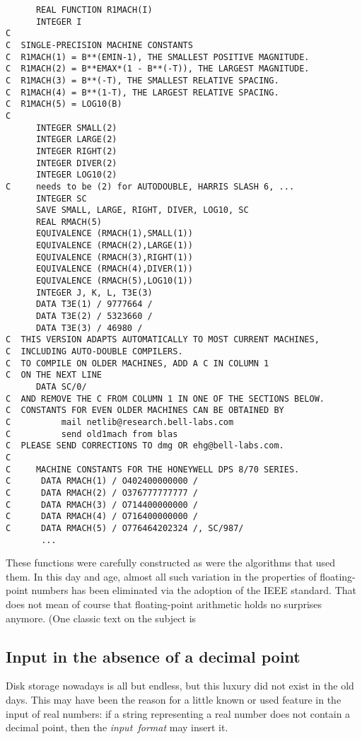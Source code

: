 \begin{verbatim}
      REAL FUNCTION R1MACH(I)
      INTEGER I
C
C  SINGLE-PRECISION MACHINE CONSTANTS
C  R1MACH(1) = B**(EMIN-1), THE SMALLEST POSITIVE MAGNITUDE.
C  R1MACH(2) = B**EMAX*(1 - B**(-T)), THE LARGEST MAGNITUDE.
C  R1MACH(3) = B**(-T), THE SMALLEST RELATIVE SPACING.
C  R1MACH(4) = B**(1-T), THE LARGEST RELATIVE SPACING.
C  R1MACH(5) = LOG10(B)
C
      INTEGER SMALL(2)
      INTEGER LARGE(2)
      INTEGER RIGHT(2)
      INTEGER DIVER(2)
      INTEGER LOG10(2)
C     needs to be (2) for AUTODOUBLE, HARRIS SLASH 6, ...
      INTEGER SC
      SAVE SMALL, LARGE, RIGHT, DIVER, LOG10, SC
      REAL RMACH(5)
      EQUIVALENCE (RMACH(1),SMALL(1))
      EQUIVALENCE (RMACH(2),LARGE(1))
      EQUIVALENCE (RMACH(3),RIGHT(1))
      EQUIVALENCE (RMACH(4),DIVER(1))
      EQUIVALENCE (RMACH(5),LOG10(1))
      INTEGER J, K, L, T3E(3)
      DATA T3E(1) / 9777664 /
      DATA T3E(2) / 5323660 /
      DATA T3E(3) / 46980 /
C  THIS VERSION ADAPTS AUTOMATICALLY TO MOST CURRENT MACHINES,
C  INCLUDING AUTO-DOUBLE COMPILERS.
C  TO COMPILE ON OLDER MACHINES, ADD A C IN COLUMN 1
C  ON THE NEXT LINE
      DATA SC/0/
C  AND REMOVE THE C FROM COLUMN 1 IN ONE OF THE SECTIONS BELOW.
C  CONSTANTS FOR EVEN OLDER MACHINES CAN BE OBTAINED BY
C          mail netlib@research.bell-labs.com
C          send old1mach from blas
C  PLEASE SEND CORRECTIONS TO dmg OR ehg@bell-labs.com.
C
C     MACHINE CONSTANTS FOR THE HONEYWELL DPS 8/70 SERIES.
C      DATA RMACH(1) / O402400000000 /
C      DATA RMACH(2) / O376777777777 /
C      DATA RMACH(3) / O714400000000 /
C      DATA RMACH(4) / O716400000000 /
C      DATA RMACH(5) / O776464202324 /, SC/987/
       ...
\end{verbatim}

These functions were carefully constructed as were the algorithms that used
them. In this day and age, almost all such variation in the properties of
floating-point numbers has been eliminated via the adoption of the IEEE standard.
That does not mean of course that floating-point arithmetic holds no surprises
anymore. (One classic text on the subject is


\subsection{Input in the absence of a decimal point}
Disk storage nowadays is all but endless, but this luxury did not exist in the old days.
This may have been the reason for a little known or used feature in the input of real numbers:
if a string representing a real number does not contain a decimal point, then the \emph{input~format}
may insert it.

